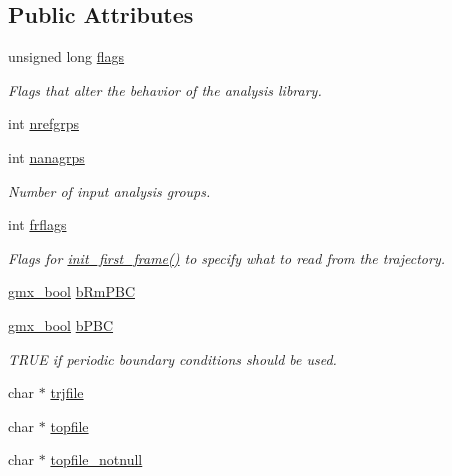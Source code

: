 \subsection*{\-Public \-Attributes}
\begin{DoxyCompactItemize}
\item 
unsigned long \hyperlink{structgmx__ana__traj__t_a68db89f34ec8fb3478326298e6b837dd}{flags}
\begin{DoxyCompactList}\small\item\em \-Flags that alter the behavior of the analysis library. \end{DoxyCompactList}\item 
int \hyperlink{structgmx__ana__traj__t_ac88221ec4ace1f7b856fd8cc992786d9}{nrefgrps}
\item 
int \hyperlink{structgmx__ana__traj__t_a58918d6931f4e6a197c2087c9b284fc4}{nanagrps}
\begin{DoxyCompactList}\small\item\em \-Number of input analysis groups. \end{DoxyCompactList}\item 
int \hyperlink{structgmx__ana__traj__t_ae7b0a4363430783635ca1af2369e5966}{frflags}
\begin{DoxyCompactList}\small\item\em \-Flags for \hyperlink{trajana_8c_abf56fc7376d3da82470309d3a60435f3}{init\-\_\-first\-\_\-frame()} to specify what to read from the trajectory. \end{DoxyCompactList}\item 
\hyperlink{include_2types_2simple_8h_a8fddad319f226e856400d190198d5151}{gmx\-\_\-bool} \hyperlink{structgmx__ana__traj__t_ac86fe68b49a69a04c634dc01129254f2}{b\-Rm\-P\-B\-C}
\item 
\hyperlink{include_2types_2simple_8h_a8fddad319f226e856400d190198d5151}{gmx\-\_\-bool} \hyperlink{structgmx__ana__traj__t_a8862da60fa57eee0775c8050546c3975}{b\-P\-B\-C}
\begin{DoxyCompactList}\small\item\em \-T\-R\-U\-E if periodic boundary conditions should be used. \end{DoxyCompactList}\item 
char $\ast$ \hyperlink{structgmx__ana__traj__t_a2d8ce4fe5e33a342e8d0d874653dead7}{trjfile}
\item 
char $\ast$ \hyperlink{structgmx__ana__traj__t_a8ff9778535f8cdc0754879a13658b986}{topfile}
\item 
char $\ast$ \hyperlink{structgmx__ana__traj__t_ab05a04129753cb7d7667fd3a3f5da8f4}{topfile\-\_\-notnull}

\end{DoxyCompactItemize}
